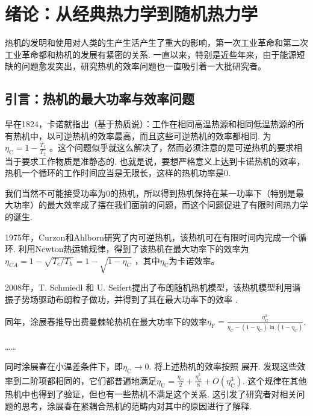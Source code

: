 \chapter{绪论：从经典热力学到随机热力学}
热机的发明和使用对人类的生产生活产生了重大的影响，第一次工业革命和第二次工业革命都和热机的发展有紧密的关系. 一直以来，特别是近些年来，由于能源短缺的问题愈发突出，研究热机的效率问题也一直吸引着一大批研究者。

\section{引言：热机的最大功率与效率问题}
\quad 早在1824，卡诺就指出（基于热质说）\cite{2005}：工作在相同高温热源和相同低温热源的所有热机中，以可逆热机的效率最高，而且这些可逆热机的效率都相同. 为$\eta _{\text{C}}=1-\frac{T_1}{T_2}$ 。这个问题似乎就这么解决了，然而必须注意的是可逆热机的要求相当于要求工作物质是准静态的. 也就是说，要想严格意义上达到卡诺热机的效率，热机一个循环的工作时间应当是无限长，这样的热机功率是0.

我们当然不可能接受功率为0的热机，所以得到热机保持在某一功率下（特别是最大功率）的最大效率成了摆在我们面前的问题，而这个问题促进了有限时间热力学的诞生. 

1975年，Curzon和Ahlborn研究了内可逆热机\cite{Curzon1975}，该热机可在有限时间内完成一个循环. 利用Newton热运输规律，得到了该热机在最大功率下的效率为$\eta _{CA}=1-\sqrt{T_c/T_h}=1-\sqrt{1-\eta _C}$ ，其中$\eta _\text{C}$为卡诺效率。

2008年，T. Schmiedl 和 U. Seifert提出了布朗随机热机模型\cite{Schmiedl2008}，该热机模型利用谐振子势场驱动布朗粒子做功，并得到了其在最大功率下的效率 . 

同年，涂展春推导出费曼棘轮热机\cite{Tu2008}在最大功率下的效率$\eta _{\text{F}}=\frac{\eta _{\text{C}}^{2}}{\eta _{\text{C}}-\left( 1-\eta _{\text{C}} \right) \ln \left( 1-\eta _{\text{C}} \right)}$. \cite{Tu2020}

……



同时涂展春\cite{Tu2008}在小温差条件下，即$\eta _{\text{C}}\rightarrow 0$. 将上述热机的效率按照 展开. 发现这些效率到二阶项都相同的，它们都普遍地满足$\eta _{\text{U}}=\frac{\eta _{\text{C}}}{2}+\frac{\eta _{\text{C}}^{2}}{8}+O\left( \eta _{\text{C}}^{3} \right)$. 这个规律在其他热机中也得到了验证，但也有一些热机不满足这个关系. 这引发了研究者对相关问题的思考，涂展春在紧耦合热机的范畴内对其中的原因进行了解释.\cite{Tu2020}

